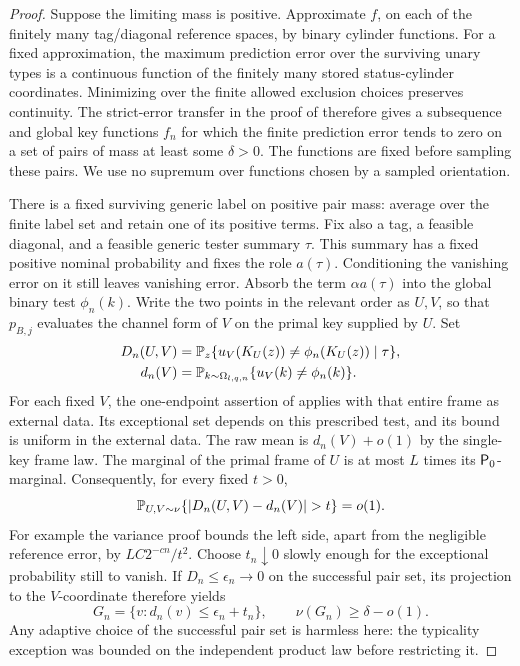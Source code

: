 \begin{proof}
Suppose the limiting mass is positive.  Approximate \(f\), on
each of the finitely many tag/diagonal reference spaces, by binary
cylinder functions.  For a fixed approximation, the maximum
prediction error over the surviving unary types is a continuous
function of the finitely many stored status-cylinder coordinates.
Minimizing over the finite allowed exclusion choices preserves
continuity.  The strict-error transfer in the proof of
 therefore gives a subsequence
and global key functions \(f_n\) for which the finite prediction
error tends to zero on a set of pairs of mass at least some
\(\delta>0\).  The functions are fixed before sampling these
pairs.  We use no supremum over functions chosen by a sampled
orientation.

There is a fixed surviving generic label on positive pair mass:
average over the finite label set and retain one of its positive
terms.  Fix also a tag, a feasible diagonal, and a feasible generic
tester summary \(\tau\).  This summary has a fixed positive
nominal probability and fixes the role \(a(\tau)\).  Conditioning
the vanishing error on it still leaves vanishing error.  Absorb
the term \(\alpha a(\tau)\) into the global binary test
\(\phi_n(k)\).  Write the two points in the relevant order as
\(U,V\), so that \(p_{B,j}\) evaluates the channel form of
\(V\) on the primal key supplied by \(U\).  Set
\[
 \begin{split}
 D_n(U,V)&=\mathbb P_z\{u_V(K_U(z))\ne\phi_n(K_U(z))
                       \mid \tau\},\\
 d_n(V)&=\mathbb P_{k\sim\Omega_{l,q,n}}
                         \{u_V(k)\ne\phi_n(k)\}.
 \end{split}
\]
For each fixed \(V\), the one-endpoint assertion of
 applies with that entire frame as external
data.  Its exceptional set depends on this prescribed test, and
its bound is uniform in the external data.  The raw mean is
\(d_n(V)+o(1)\) by the single-key frame law.  The marginal
of the primal frame of \(U\) is at most \(L\) times its
\({\mathsf P_0}\)-marginal.  Consequently, for every fixed
\(t>0\),
\[
 \PP_{U,V\sim\nu}\{|D_n(U,V)-d_n(V)|>t\}=o(1).
\]
For example the variance proof bounds the left side, apart from
the negligible reference error, by \(LC2^{-cn}/t^2\).
Choose \(t_n\downarrow0\) slowly enough for the exceptional
probability still to vanish.  If \(D_n\le\epsilon_n\to0\)
on the successful pair set, its projection to the \(V\)-coordinate
therefore yields
\[
 G_n=\{v:d_n(v)\le\epsilon_n+t_n\},\qquad
 \nu(G_n)\ge\delta-o(1).
\]
Any adaptive choice of the successful pair set is harmless here:
the typicality exception was bounded on the independent product
law before restricting it.


\end{proof}
